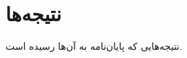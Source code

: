 \documentclass{article}[a4paper, 11px]
\begin{document}
\section{
نتیجه‌ها
}

نتیجه‌هایی که پایان‌نامه به آن‌ها رسیده است.
\end{document}
